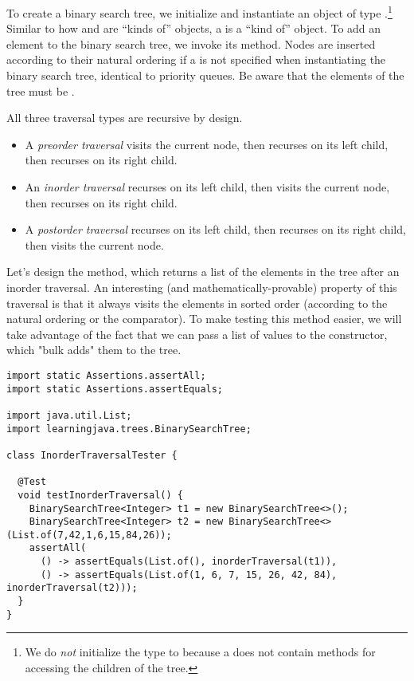 To create a binary search tree, we initialize and instantiate an object of type .\footnote{We do \emph{not} initialize the type to  because a  does not contain methods for accessing the children of the tree.}
Similar to how  and  are ``kinds of''  objects, a  is a ``kind of''  object.
To add an element to the binary search tree, we invoke its  method. 
Nodes are inserted according to their natural ordering if a  is not specified when instantiating the binary search tree, identical to priority queues.
Be aware that the elements of the tree must be .

All three traversal types are recursive by design.
\begin{itemize}
  \item A \emph{preorder traversal} visits the current node, then recurses on its left child, then recurses on its right child.
  \item An \emph{inorder traversal} recurses on its left child, then visits the current node, then recurses on its right child.
  \item A \emph{postorder traversal} recurses on its left child, then recurses on its right child, then visits the current node.
\end{itemize}

Let's design the  method, which returns a list of the elements in the tree after an inorder traversal. 
An interesting (and mathematically-provable) property of this traversal is that it always visits the elements in sorted order (according to the natural ordering or the comparator). 
To make testing this method easier, we will take advantage of the fact that we can pass a list of values to the  constructor, which "bulk adds" them to the tree.

\begin{lstlisting}[language=MyJava]
import static Assertions.assertAll;
import static Assertions.assertEquals;

import java.util.List;
import learningjava.trees.BinarySearchTree;

class InorderTraversalTester {

  @Test
  void testInorderTraversal() {
    BinarySearchTree<Integer> t1 = new BinarySearchTree<>();
    BinarySearchTree<Integer> t2 = new BinarySearchTree<>(List.of(7,42,1,6,15,84,26));
    assertAll(
      () -> assertEquals(List.of(), inorderTraversal(t1)),
      () -> assertEquals(List.of(1, 6, 7, 15, 26, 42, 84), inorderTraversal(t2)));
  }
}

\end{lstlisting}

